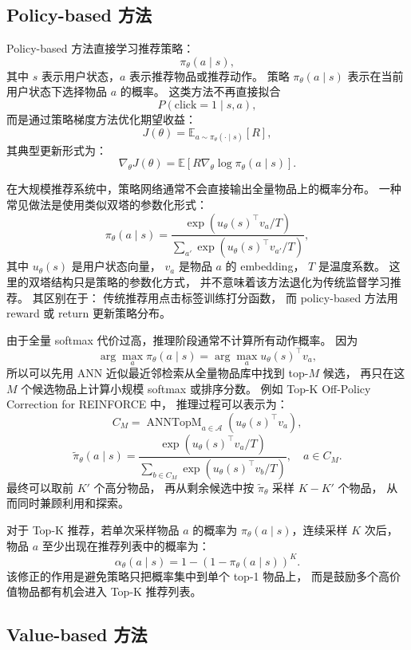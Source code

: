 \documentclass[11pt]{ctexart}
\begin{document}
\subsection{Policy-based 方法}
\label{subsec:policy_based_recsys}

Policy-based 方法直接学习推荐策略：
\[
\pi_{\theta}(a \mid s),
\]
其中 \(s\) 表示用户状态，\(a\) 表示推荐物品或推荐动作。
策略 \(\pi_{\theta}(a \mid s)\) 表示在当前用户状态下选择物品 \(a\) 的概率。
这类方法不再直接拟合
\[
P(\text{click}=1 \mid s,a),
\]
而是通过策略梯度方法优化期望收益：
\[
J(\theta)
=
\mathbb{E}_{a\sim \pi_{\theta}(\cdot \mid s)}
\left[
R
\right],
\]
其典型更新形式为：
\[
\nabla_{\theta}J(\theta)
=
\mathbb{E}
\left[
R
\nabla_{\theta}\log \pi_{\theta}(a\mid s)
\right].
\]

在大规模推荐系统中，策略网络通常不会直接输出全量物品上的概率分布。
一种常见做法是使用类似双塔的参数化形式：
\[
\pi_{\theta}(a\mid s)
=
\frac{\exp(u_{\theta}(s)^{\top}v_a/T)}
{\sum_{a'}\exp(u_{\theta}(s)^{\top}v_{a'}/T)},
\]
其中 \(u_{\theta}(s)\) 是用户状态向量，
\(v_a\) 是物品 \(a\) 的 embedding，
\(T\) 是温度系数。
这里的双塔结构只是策略的参数化方式，
并不意味着该方法退化为传统监督学习推荐。
其区别在于：
传统推荐用点击标签训练打分函数，
而 policy-based 方法用 reward 或 return 更新策略分布。

由于全量 softmax 代价过高，推理阶段通常不计算所有动作概率。
因为
\[
\arg\max_a \pi_{\theta}(a\mid s)
=
\arg\max_a u_{\theta}(s)^{\top}v_a,
\]
所以可以先用 ANN 近似最近邻检索从全量物品库中找到 top-\(M\) 候选，
再只在这 \(M\) 个候选物品上计算小规模 softmax 或排序分数。
例如 Top-K Off-Policy Correction for REINFORCE 中，
推理过程可以表示为：
\[
C_M
=
\operatorname{ANNTopM}_{a\in\mathcal{A}}
\left(
u_{\theta}(s)^{\top}v_a
\right),
\]
\[
\tilde{\pi}_{\theta}(a\mid s)
=
\frac{\exp(u_{\theta}(s)^{\top}v_a/T)}
{\sum_{b\in C_M}\exp(u_{\theta}(s)^{\top}v_b/T)},
\quad a\in C_M.
\]
最终可以取前 \(K'\) 个高分物品，
再从剩余候选中按 \(\tilde{\pi}_{\theta}\) 采样 \(K-K'\) 个物品，
从而同时兼顾利用和探索。

对于 Top-K 推荐，若单次采样物品 \(a\) 的概率为
\(\pi_{\theta}(a\mid s)\)，连续采样 \(K\) 次后，
物品 \(a\) 至少出现在推荐列表中的概率为：
\[
\alpha_{\theta}(a\mid s)
=
1-
\left(
1-\pi_{\theta}(a\mid s)
\right)^K.
\]
该修正的作用是避免策略只把概率集中到单个 top-1 物品上，
而是鼓励多个高价值物品都有机会进入 Top-K 推荐列表。

\subsection{Value-based 方法}
\label{subsec:value_based_recsys}
\end{document}
